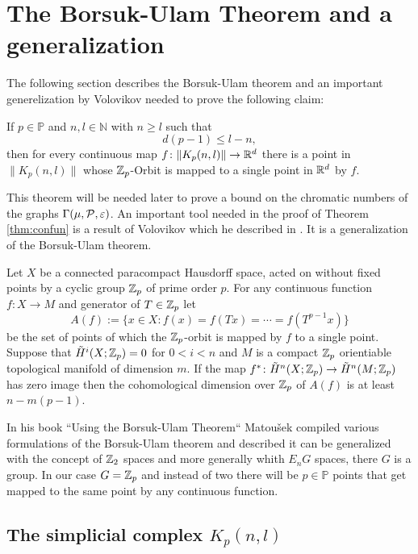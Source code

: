 \section{The Borsuk-Ulam Theorem and a generalization}

The following section describes the Borsuk-Ulam theorem and an important generelization by Volovikov needed to prove the following claim:
\begin{thm}\label{thm:confun}
  If $p \in \mathbb{P}$ and $n, l \in \mathbb{N}$ with $n \geq l$ such that
  \begin{equation*}
    d(p-1) \leq l - n,
  \end{equation*}
  then for every continuous map $f\colon\lVert K_p(n,l)\rVert \to \R^d$ there is a point in $\lVert K_p(n,l)\rVert$ whose $\Z_p$-Orbit is mapped to a single point in $\R^d$ by $f$.
\end{thm}
This theorem will be needed later to prove a bound on the chromatic numbers of the graphs $\Gamma(\mu, \P, \varepsilon)$.
An important tool needed in the proof of Theorem \ref{thm:confun} is a result of Volovikov which he described in \cite{vol1980}. It is a generalization of the Borsuk-Ulam theorem.
\begin{lemma}\label{lem:vol}
  Let $X$ be a connected paracompact Hausdorff space, acted on without fixed points by a cyclic group $\Z_p$ of prime order $p$. For any continuous function $f\colon X \to M$ and generator of $T \in \Z_p$ let
  \begin{equation*}
    A(f) := \{x\in X\colon f(x) = f(Tx) = \cdots = f(T^{p-1}x)\}
  \end{equation*}
  be the set of points of which the $\Z_p$-orbit is mapped by $f$ to a single point. Suppose that $\tilde{H}^i(X; \Z_p) = 0$ for $0 < i < n$ and $M$ is a compact $\Z_p$ orientiable topological manifold of dimension $m$. If the map $f^*\colon \tilde{H}^n(X; \Z_p) \to \tilde{H}^n(M; \Z_p)$ has zero image then the cohomological dimension over $\Z_p$ of $A(f)$ is at least $n-m(p-1)$. 
\end{lemma}

In his book ``Using the Borsuk-Ulam Theorem`` \cite{using2003} Matoušek compiled various formulations of the Borsuk-Ulam theorem and described it can be generalized with the concept of $\Z_2$ spaces and more generally whith $E_nG$ spaces, there $G$ is a group. In our case $G = \Z_p$ and instead of two there will be $p \in \mathbb{P}$ points that get mapped to the same point by any continuous function. 

\subsection{The simplicial complex $K_p(n, l)$}

